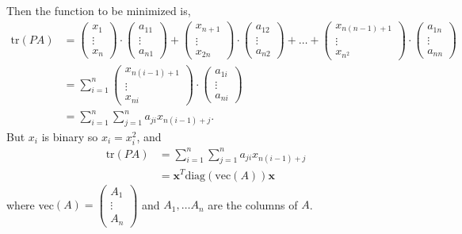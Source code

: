 \documentclass{article}
\begin{document}
\noindent Then the function to be minimized is,
\begin{align*}
    \text{tr} (PA) &= \begin{pmatrix}
        x_1 \\
        \vdots \\
        x_n
    \end{pmatrix} \cdot \begin{pmatrix}
        a_{11}\\
        \vdots \\
        a_{n1}
    \end{pmatrix} + \begin{pmatrix}
        x_{n+1} \\
        \vdots \\
        x_{2n}
    \end{pmatrix} \cdot \begin{pmatrix}
        a_{12}\\
        \vdots \\
        a_{n2}
    \end{pmatrix} + \hdots + \begin{pmatrix}
        x_{n(n-1) + 1} \\
        \vdots \\
        x_{n^2}
    \end{pmatrix} \cdot \begin{pmatrix}
        a_{1n}\\
        \vdots \\
        a_{nn}
    \end{pmatrix} \\
    &= \sum_{i=1}^{n} \begin{pmatrix}
        x_{n(i-1) + 1} \\
        \vdots \\
        x_{ni}
    \end{pmatrix} \cdot \begin{pmatrix}
        a_{1i} \\
        \vdots \\
        a_{ni}
    \end{pmatrix} \\
    &= \sum_{i=1}^{n} \sum_{j=1}^{n} a_{ji}x_{n(i-1)+j}.
\end{align*}
But \(x_i\) is binary so \(x_i = x_i^2\), and 
\begin{align*}
    \text{tr}(PA) &= \sum_{i=1}^{n} \sum_{j=1}^{n} a_{ji}x_{n(i-1)+j} \\
    &= \mathbf{x}^T \text{diag}(\text{vec}(A))\mathbf{x}
\end{align*}
where vec\((A) = \begin{pmatrix}
    A_1 \\
    \vdots \\
    A_n
\end{pmatrix}\) and \(A_1, \dots A_n\) are the columns of \(A\).\\
\end{document}
